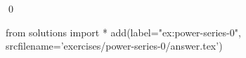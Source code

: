 \begin{ex}
  \label{ex:power-series-0}
  
  \qed
\end{ex}
\begin{python0}
from solutions import *
add(label="ex:power-series-0",
    srcfilename='exercises/power-series-0/answer.tex') 
\end{python0}                              
